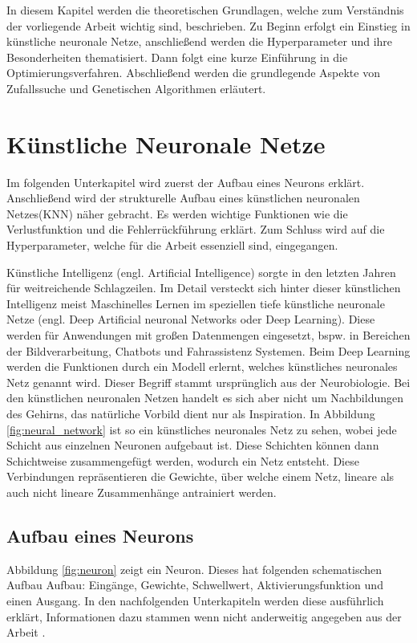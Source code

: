 \label{sec:Grundlagen}
In diesem Kapitel werden die theoretischen Grundlagen, welche zum Verständnis der vorliegende Arbeit wichtig sind, beschrieben. Zu Beginn erfolgt ein Einstieg in künstliche neuronale Netze, anschließend werden die Hyperparameter und ihre Besonderheiten thematisiert. Dann folgt eine kurze Einführung in die Optimierungsverfahren. Abschließend werden die grundlegende Aspekte von Zufallssuche und Genetischen Algorithmen erläutert.

\section{Künstliche Neuronale Netze}
Im folgenden Unterkapitel wird zuerst der Aufbau eines Neurons erklärt. Anschließend wird der strukturelle Aufbau eines künstlichen neuronalen Netzes(KNN) näher gebracht. Es werden wichtige Funktionen wie die Verlustfunktion und die Fehlerrückführung erklärt. Zum Schluss wird auf die Hyperparameter, welche für die Arbeit essenziell sind, eingegangen.

Künstliche Intelligenz (engl. Artificial Intelligence) sorgte in den letzten Jahren für weitreichende Schlagzeilen. Im Detail versteckt sich hinter dieser künstlichen Intelligenz meist Maschinelles Lernen im speziellen tiefe künstliche neuronale Netze (engl. Deep Artificial neuronal Networks oder Deep Learning). Diese werden für Anwendungen mit großen Datenmengen eingesetzt, bspw. in Bereichen der Bildverarbeitung, Chatbots und Fahrassistenz Systemen. Beim Deep Learning werden die Funktionen durch ein Modell erlernt, welches künstliches neuronales Netz genannt wird. Dieser Begriff stammt ursprünglich aus der Neurobiologie. Bei den künstlichen neuronalen Netzen handelt es sich aber nicht um Nachbildungen des Gehirns, das natürliche Vorbild dient nur als Inspiration. In Abbildung \ref{fig:neural_network} ist so ein künstliches neuronales Netz zu sehen, wobei jede Schicht aus einzelnen Neuronen aufgebaut ist. Diese Schichten können dann Schichtweise zusammengefügt werden, wodurch ein Netz entsteht. Diese Verbindungen repräsentieren die Gewichte, über welche einem Netz, lineare als auch nicht lineare Zusammenhänge antrainiert werden. \cite[p.~11]{Silva2016}

\subsection{Aufbau eines Neurons}
\label{Aufbau eines Neurons}
Abbildung \ref{fig:neuron} zeigt ein Neuron. Dieses hat folgenden schematischen Aufbau Aufbau: Eingänge, Gewichte, Schwellwert, Aktivierungsfunktion und einen Ausgang. In den nachfolgenden Unterkapiteln werden diese ausführlich erklärt, Informationen dazu stammen wenn nicht anderweitig angegeben aus der Arbeit \cite[p.~12]{Silva2016}.

